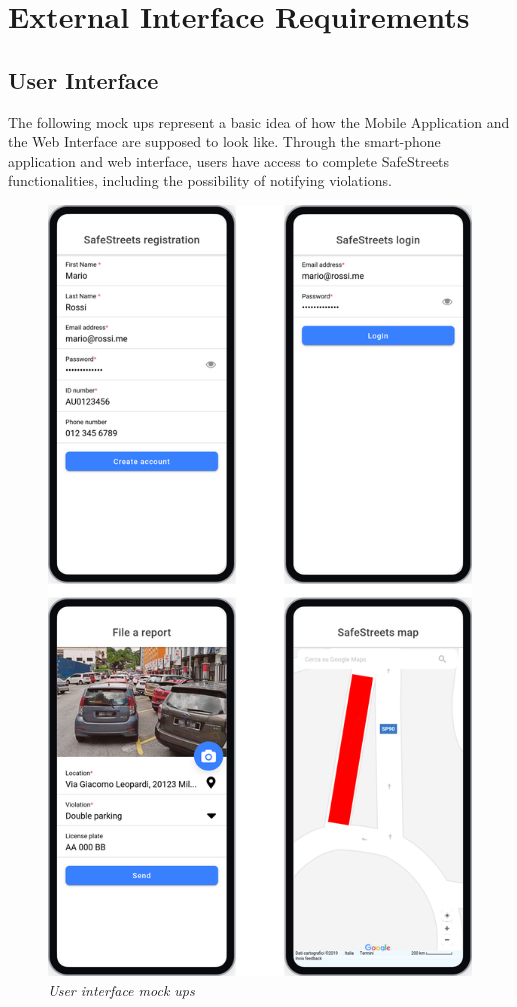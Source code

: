 \section{External Interface Requirements}

\subsection{User Interface}
The following mock ups represent a basic idea of how the Mobile Application
and the Web Interface are supposed to look like.
Through the smart-phone application and web interface, users have access to complete SafeStreets functionalities, including the possibility of notifying violations.

\begin{figure}[H]
  \centering
  \includegraphics[origin=c,width=\textwidth,height=.95\textheight,keepaspectratio]{RASD_Images/UserInterface/All.jpg}
  \caption{\textit{User interface mock ups}}
\end{figure}

